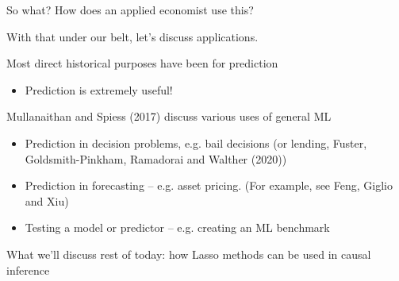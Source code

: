 \documentclass[notes,11pt, aspectratio=169]{beamer}
\newenvironment{wideitemize}{\itemize\addtolength{\itemsep}{10pt}}{\enditemize}
\begin{document}
\begin{frame}{So what? How does an applied economist use this?}
  \begin{wideitemize}
  \item   With that under our belt, let's discuss applications.
  \item Most direct historical purposes have been for prediction
    \begin{itemize}
    \item Prediction is extremely useful! 
    \end{itemize}
  \item Mullanaithan and Spiess (2017) discuss various uses of general ML
    \begin{itemize}
    \item Prediction in decision problems, e.g. bail decisions (or
      lending, Fuster, Goldsmith-Pinkham, Ramadorai and Walther
      (2020))
    \item Prediction in forecasting -- e.g. asset pricing. (For example, see Feng, Giglio and Xiu)
    \item Testing a model or predictor -- e.g. creating an ML
      benchmark 
    \end{itemize}
  \item What we'll discuss rest of today: how Lasso methods can be
    used in causal inference
  \end{wideitemize}
\end{frame}
\end{document}

